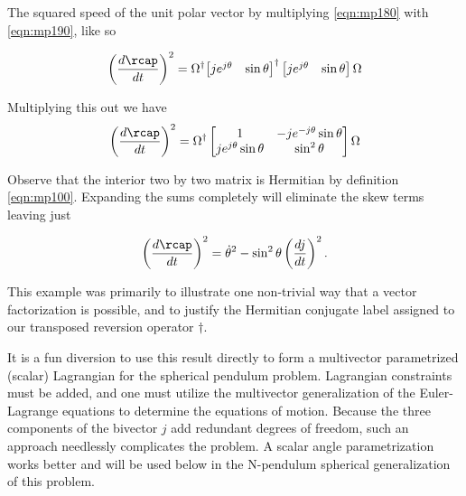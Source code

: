 The squared speed of the unit polar vector by multiplying \ref{eqn:mp180} with \ref{eqn:mp190}, like so

\begin{align}\label{eqn:mp200}
\left( \frac{d\rcap}{dt} \right)^2 =
\Omega^\dagger
{\begin{bmatrix}
j e^{j \theta} & \sin\theta
\end{bmatrix}}^\dagger
\begin{bmatrix}
j e^{j \theta} & \sin\theta
\end{bmatrix}
\Omega
\end{align}

Multiplying this out we have
\begin{align}\label{eqn:mp210}
\left( \frac{d\rcap}{dt} \right)^2 =
\Omega^\dagger
\begin{bmatrix}
1 & -j e^{-j\theta}\sin\theta \\
j e^{j\theta}\sin\theta  & \sin^2\theta
\end{bmatrix}
\Omega
\end{align}

Observe that the interior two by two matrix is Hermitian by definition \ref{eqn:mp100}.  Expanding the sums completely will eliminate the skew terms leaving just

\begin{align}\label{eqn:mp220}
\left( \frac{d\rcap}{dt} \right)^2 =
\dot{\theta}^2 - \sin^2 \theta \left(\frac{dj}{dt}\right)^2.
\end{align}

This example was primarily to illustrate one non-trivial way that a vector factorization is possible, and to justify the Hermitian conjugate label assigned to our transposed reversion operator $\dagger$.

It is a fun diversion to use this result directly to form a multivector parametrized (scalar) Lagrangian for the spherical pendulum problem.  Lagrangian constraints must be added, and one must utilize the multivector generalization of the Euler-Lagrange equations to determine the equations of motion.  Because the three components of the bivector $j$ add redundant degrees of freedom, such an approach needlessly complicates the problem.  A scalar angle parametrization works better and will be used below in the N-pendulum spherical generalization of this problem.

\EndArticle
